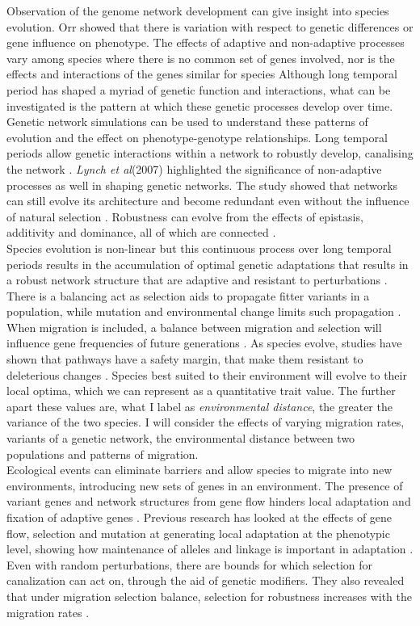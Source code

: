 Observation of the genome network development can give insight into species evolution. Orr showed that there is variation with respect to genetic differences or gene influence on phenotype. The effects of adaptive and non-adaptive processes vary among species where there is no common set of genes involved, nor is the effects and interactions of the genes similar for species \cite{orr1998population} Although long temporal period has shaped a myriad of genetic function and interactions, what can be investigated is the pattern at which these genetic processes develop over time. Genetic network simulations can be used to understand these patterns of evolution and the effect on phenotype-genotype relationships. Long temporal periods allow genetic interactions within a network to robustly develop, canalising the network \cite{orr1998population,lynch2007evolution}. \textit{Lynch et al}(2007) highlighted the significance of non-adaptive processes as well in shaping genetic networks. The study showed that networks can still evolve its architecture and become redundant even without the influence of natural selection \cite{lynch2007evolution}. Robustness can evolve from the effects of epistasis, additivity and dominance, all of which are connected \cite{omholt2000gene}.\\
Species evolution is non-linear but this continuous process over long temporal periods results in the accumulation of optimal genetic adaptations that results in a robust network structure that are adaptive and resistant to perturbations \cite{hinman2009evolution}. There is a balancing act as selection aids to propagate fitter variants in a population, while mutation and environmental change limits such propagation \cite{burt1995evolution}. When migration is included, a balance between migration and selection will influence gene frequencies of future generations \cite{brown1992evolution}. As species evolve, studies have shown that pathways have a safety margin, that make them resistant to deleterious changes \cite{bourguet1999evolution}. Species best suited to their environment will evolve to their local optima, which we can represent as a quantitative trait value. The further apart these values are, what I label as \textit{environmental distance}, the greater the variance of the two species. I will consider the effects of varying migration rates, variants of a genetic network, the environmental distance between two populations and patterns of migration.\\
Ecological events can eliminate barriers and allow species to migrate into new environments, introducing new sets of genes in an environment. The presence of variant genes and network structures from gene flow hinders local adaptation and fixation of adaptive genes \cite{burt1995evolution}. Previous research has looked at the effects of gene flow, selection and mutation at generating local adaptation at the phenotypic level, showing how maintenance of alleles and linkage is important in adaptation \cite{yeaman2011genetic}. Even with random perturbations, there are bounds for which selection for canalization can act on, through the aid of genetic modifiers. They also revealed that under migration selection balance, selection for robustness increases with the migration rates \cite{proulx2005opportunity}.\\
